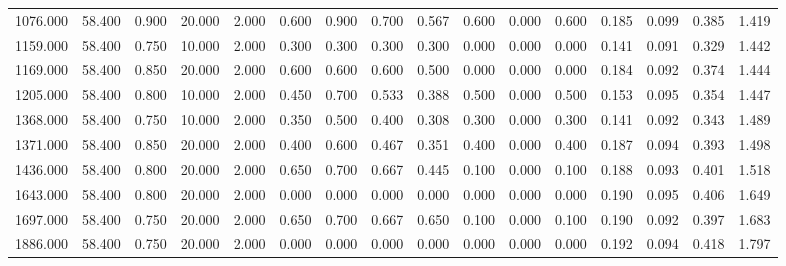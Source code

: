 \begin{tabular}{rrrrrrrrrrrrrrrr}
1076.000 & 58.400 & 0.900 & 20.000 & 2.000 & 0.600 & 0.900 & 0.700 & 0.567 & 0.600 & 0.000 & 0.600 & 0.185 & 0.099 & 0.385 & 1.419 \\
1159.000 & 58.400 & 0.750 & 10.000 & 2.000 & 0.300 & 0.300 & 0.300 & 0.300 & 0.000 & 0.000 & 0.000 & 0.141 & 0.091 & 0.329 & 1.442 \\
1169.000 & 58.400 & 0.850 & 20.000 & 2.000 & 0.600 & 0.600 & 0.600 & 0.500 & 0.000 & 0.000 & 0.000 & 0.184 & 0.092 & 0.374 & 1.444 \\
1205.000 & 58.400 & 0.800 & 10.000 & 2.000 & 0.450 & 0.700 & 0.533 & 0.388 & 0.500 & 0.000 & 0.500 & 0.153 & 0.095 & 0.354 & 1.447 \\
1368.000 & 58.400 & 0.750 & 10.000 & 2.000 & 0.350 & 0.500 & 0.400 & 0.308 & 0.300 & 0.000 & 0.300 & 0.141 & 0.092 & 0.343 & 1.489 \\
1371.000 & 58.400 & 0.850 & 20.000 & 2.000 & 0.400 & 0.600 & 0.467 & 0.351 & 0.400 & 0.000 & 0.400 & 0.187 & 0.094 & 0.393 & 1.498 \\
1436.000 & 58.400 & 0.800 & 20.000 & 2.000 & 0.650 & 0.700 & 0.667 & 0.445 & 0.100 & 0.000 & 0.100 & 0.188 & 0.093 & 0.401 & 1.518 \\
1643.000 & 58.400 & 0.800 & 20.000 & 2.000 & 0.000 & 0.000 & 0.000 & 0.000 & 0.000 & 0.000 & 0.000 & 0.190 & 0.095 & 0.406 & 1.649 \\
1697.000 & 58.400 & 0.750 & 20.000 & 2.000 & 0.650 & 0.700 & 0.667 & 0.650 & 0.100 & 0.000 & 0.100 & 0.190 & 0.092 & 0.397 & 1.683 \\
1886.000 & 58.400 & 0.750 & 20.000 & 2.000 & 0.000 & 0.000 & 0.000 & 0.000 & 0.000 & 0.000 & 0.000 & 0.192 & 0.094 & 0.418 & 1.797 \\
\bottomrule
\end{tabular}
